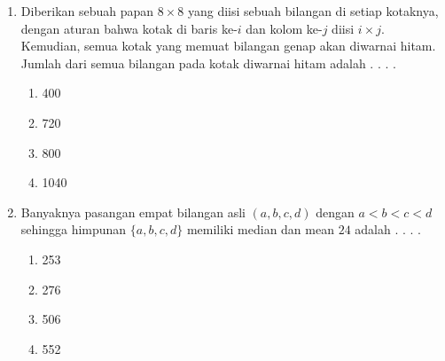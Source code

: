 \documentclass{article}
\begin{document}
\begin{enumerate}[label={Soal \arabic*}]
    \item Diberikan sebuah papan $8\times 8$ yang diisi sebuah bilangan di setiap kotaknya, dengan aturan bahwa kotak di baris ke-$i$ dan kolom ke-$j$ diisi $i\times j$. Kemudian, semua kotak yang memuat bilangan genap akan diwarnai hitam. Jumlah dari semua bilangan pada kotak diwarnai hitam adalah . . . .
    \begin{enumerate}[label={(\Alph*)}]
        \item 400 \item 720 \item 800 \item 1040
    \end{enumerate}

    \item Banyaknya pasangan empat bilangan asli $(a,b,c,d)$ dengan $a<b<c<d$ sehingga himpunan $\{a,b,c,d\}$ memiliki median dan mean $24$ adalah . . . .
    \begin{enumerate}[label={(\Alph*)}]
        \item 253 \item 276 \item 506 \item 552
    \end{enumerate}
\end{enumerate}
\end{document}
